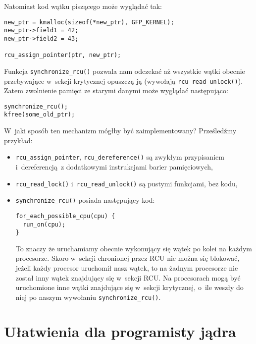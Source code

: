 \documentclass[shortabstract]{iithesis}
\theoremstyle{definition} \newtheorem*{definition}{Definicja}
\theoremstyle{definition} \newtheorem*{example}{Przykład}
\theoremstyle{definition} \newtheorem*{remark}{Uwaga}
\begin{document}
Natomiast kod wątku piszącego może wyglądać tak:
\begin{lstlisting}
new_ptr = kmalloc(sizeof(*new_ptr), GFP_KERNEL);
new_ptr->field1 = 42;
new_ptr->field2 = 43;

rcu_assign_pointer(ptr, new_ptr);
\end{lstlisting}

Funkcja \texttt{synchronize\_rcu()} pozwala nam odczekać aż wszystkie wątki obecnie przebywające w~sekcji
krytycznej opuszczą ją (wywołają \texttt{rcu\_read\_unlock()}). Zatem zwolnienie pamięci ze starymi danymi
może wyglądać następująco:
\begin{lstlisting}
synchronize_rcu();
kfree(some_old_ptr);
\end{lstlisting}

W~jaki sposób ten mechanizm mógłby być zaimplementowany? Prześledźmy przykład:
\begin{itemize}
\item \texttt{rcu\_assign\_pointer}, \texttt{rcu\_dereference()} są zwykłym przypisaniem i~dereferencją z dodatkowymi
instrukcjami barier pamięciowych,
\item \texttt{rcu\_read\_lock()} i~\texttt{rcu\_read\_unlock()} są pustymi funkcjami, bez kodu,
\item \texttt{synchronize\_rcu()} posiada następujący kod:
\begin{lstlisting}
for_each_possible_cpu(cpu) {
  run_on(cpu);
}
\end{lstlisting}
To znaczy że uruchamiamy obecnie wykonujący się wątek po kolei na każdym procesorze. Skoro w~sekcji chronionej
przez RCU nie można się blokować, jeżeli każdy procesor uruchomił nasz wątek, to na żadnym procesorze nie został
inny wątek znajdujący się w~sekcji RCU. Na procesorach mogą być uruchomione inne wątki znajdujące się w~sekcji
krytycznej, o~ile weszły do niej po naszym wywołaniu \texttt{synchronize\_rcu()}.
\end{itemize}

\section{Ułatwienia dla programisty jądra}
\end{document}
